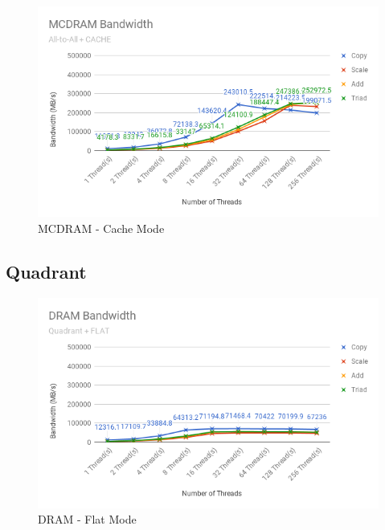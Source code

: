 \documentclass[bsc,frontabs,twoside,singlespacing,parskip,deptreport]{infthesis}     %
\begin{document}
\begin{figure}[!h]
    \centering
    \includegraphics[width=\textwidth]{Results/mcdram_a2a_c.png}
    \caption{MCDRAM - Cache Mode}
    \label{res:mcdram-a2a-c}
\end{figure}

\newpage
\newpage

\subsection{Quadrant}

\begin{figure}[!h]
    \centering
    \includegraphics[width=\textwidth]{Results/dram_quad_f.png}
    \caption{DRAM - Flat Mode}
    \label{res:dram-quad-f}
\end{figure}
\end{document}
